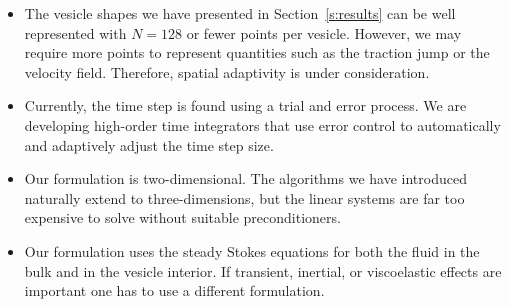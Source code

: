 \begin{itemize}

\item The vesicle shapes we have presented in Section~\ref{s:results}
can be well represented with $N=128$ or fewer points per vesicle.
However, we may require more points to represent quantities such as the
traction jump or the velocity field.  Therefore, spatial adaptivity is 
under consideration.

\item Currently, the time step is found using a trial and error
process.  We are developing high-order time integrators that use error
control to automatically and adaptively adjust the time step size.

\item Our formulation is two-dimensional.  The algorithms we have
introduced naturally extend to three-dimensions, but the linear systems
are far too expensive to solve without suitable preconditioners. 

\item Our formulation uses the steady Stokes equations for both the
fluid in the bulk and in the vesicle interior. If transient, inertial,
or viscoelastic effects are important one has to use a different
formulation.

\end{itemize}



